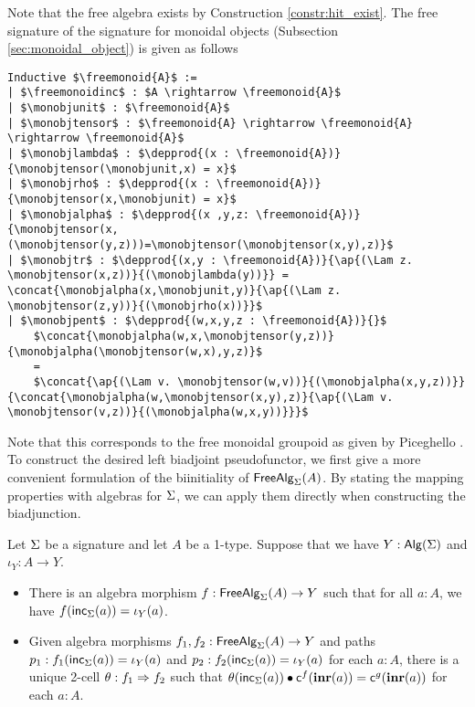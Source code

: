Note that the free algebra exists by Construction \ref{constr:hit_exist}.
The free signature of the signature for monoidal objects (Subsection \ref{sec:monoidal_object}) is given as follows

\begin{lstlisting}[mathescape=true]
Inductive $\freemonoid{A}$ :=
| $\freemonoidinc$ : $A \rightarrow \freemonoid{A}$
| $\monobjunit$ : $\freemonoid{A}$
| $\monobjtensor$ : $\freemonoid{A} \rightarrow \freemonoid{A} \rightarrow \freemonoid{A}$
| $\monobjlambda$ : $\depprod{(x : \freemonoid{A})}{\monobjtensor(\monobjunit,x) = x}$
| $\monobjrho$ : $\depprod{(x : \freemonoid{A})}{\monobjtensor(x,\monobjunit) = x}$
| $\monobjalpha$ : $\depprod{(x ,y,z: \freemonoid{A})}{\monobjtensor(x,(\monobjtensor(y,z)))=\monobjtensor(\monobjtensor(x,y),z)}$
| $\monobjtr$ : $\depprod{(x,y : \freemonoid{A})}{\ap{(\Lam z. \monobjtensor(x,z))}{(\monobjlambda(y))}} = \concat{\monobjalpha(x,\monobjunit,y)}{\ap{(\Lam z. \monobjtensor(z,y))}{(\monobjrho(x))}}$
| $\monobjpent$ : $\depprod{(w,x,y,z : \freemonoid{A})}{}$
    $\concat{\monobjalpha(w,x,\monobjtensor(y,z))}{\monobjalpha(\monobjtensor(w,x),y,z)}$
    =
    $\concat{\ap{(\Lam v. \monobjtensor(w,v))}{(\monobjalpha(x,y,z))}}{\concat{\monobjalpha(w,\monobjtensor(x,y),z)}{\ap{(\Lam v. \monobjtensor(v,z))}{(\monobjalpha(w,x,y))}}}$
\end{lstlisting}

Note that this corresponds to the free monoidal groupoid as given by Piceghello \cite{piceghello2019}.
To construct the desired left biadjoint pseudofunctor, we first give a more convenient formulation of the biinitiality of $\mathsf{FreeAlg}_{\Sigma}(A)$.
By stating the mapping properties with algebras for $\Sigma$, we can apply them directly when constructing the biadjunction.

\begin{corollary}
\label{cor:free_alg_ump}
Let $\Sigma$ be a signature and let $A$ be a 1-type.
Suppose that we have $Y : \mathsf{Alg}(\Sigma)$ and $\iota_Y : A \rightarrow Y$.
\begin{itemize}
	\item There is an algebra morphism $f : \mathsf{FreeAlg}_{\Sigma}(A) \rightarrow Y$ such that for all $a : A$, we have $f(\mathsf{inc}_{\Sigma}(a)) = \iota_Y(a)$.
	\item
	Given algebra morphisms $f_1, f_2 : \mathsf{FreeAlg}_{\Sigma}(A) \rightarrow Y$
	and paths $p_1 : f_1(\mathsf{inc}_{\Sigma}(a)) = \iota_Y(a)$ and $p_2 : f_2(\mathsf{inc}_{\Sigma}(a)) = \iota_Y(a)$ for each $a : A$,
	there is a unique 2-cell $\theta : f_1 \Rightarrow f_2$
	such that $\theta(\mathsf{inc}_{\Sigma}(a)) \bullet \mathsf{c}^{f}(\operatorname{\mathbf{inr}}(a)) = \mathsf{c}^{g}(\operatorname{\mathbf{inr}}(a))$ for each $a : A$.
\end{itemize} 
\end{corollary}

